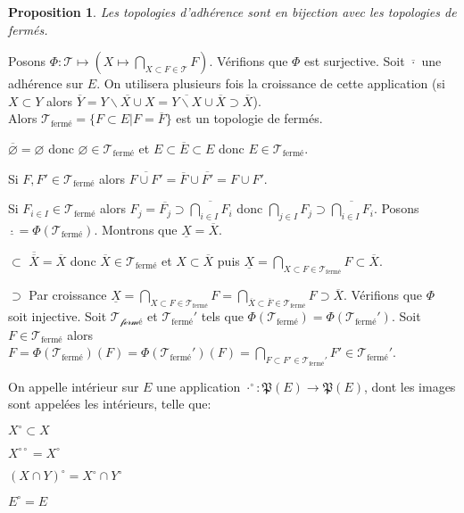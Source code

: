 \documentclass[a4paper, 11pt, french]{book}
\newenvironment{itemise}{\itemize}{\enditemize}
\theoremstyle{plain} %
\newtheorem{proposition}{Proposition}
\theoremstyle{definition} %
\theoremstyle{remark} %
\renewcommand{\setminus}{\backslash}
\newcommand{\1}{\mathds{1}}
\newcommand\vide{\varnothing}
\begin{document}
\begin{proposition}
Les topologies d'adhérence sont en bijection avec les topologies de fermés.
\end{proposition}\vspace{-3mm}
Posons $\Phi\colon\mathscr{T}\mapsto(X\mapsto\bigcap_{X\subset F\in\mathscr{T}}F)$.
Vérifions que $\Phi$ est surjective.
Soit $\overline{\cdot}$ une adhérence sur $E$.
On utilisera plusieurs fois la croissance de cette application (si $X\subset Y$ alors $\overline{Y}=\overline{Y\setminus X\cup X}=\overline{Y\setminus X}\cup\overline{X}\supset\overline{X}$). \\
Alors $\mathscr{T}_\text{fermé}=\{F\subset E|F=\overline{F}\}$ est un topologie de fermés.
\begin{itemise}
	\item $\overline{\vide}=\vide$ donc $\vide\in\mathscr{T}_\text{fermé}$ et $E\subset\overline{E}\subset E$ donc $E\in\mathscr{T}_\text{fermé}$.
	\item Si $F, F'\in\mathscr{T}_\text{fermé}$ alors $\overline{F\cup F'}=\overline{F}\cup\overline{F'}=F\cup F'$.
	\item Si $F_{i\in I}\in\mathscr{T}_\text{fermé}$ alors $F_j=\overline{F_j}\supset\overline{\bigcap_{i\in I}F_i}$ donc $\bigcap_{j\in I}F_j\supset\overline{\bigcap_{i\in I}F_i}$.
\end{itemise}
Posons $\underline{\cdot}=\Phi(\mathscr{T}_\text{fermé})$.
Montrons que $\underline{X}=\overline{X}$.
\begin{itemise}
	\item[$\subset$] $\overline{\overline{X}}=\overline{X}$ donc $\overline{X}\in\mathscr{T}_\text{fermé}$ et $X\subset\overline{X}$ puis $\underline{X}=\bigcap_{X\subset F\in\mathscr{T}_\text{fermé}}F\subset\overline{X}$.
	\item[$\supset$] Par croissance $\underline{X}=\bigcap_{X\subset F\in\mathscr{T}_\text{fermé}}F=\bigcap_{\overline{X}\subset\overline{F}\in\mathscr{T}_\text{fermé}}F\supset\overline{X}$.
\end{itemise}
Vérifions que $\Phi$ soit injective.
Soit $\mathscr{T_\text{fermé}}$ et $\mathscr{T}_\text{fermé}'$ tels que $\Phi(\mathscr{T}_\text{fermé})=\Phi(\mathscr{T}_\text{fermé}')$.
Soit $F\in\mathscr{T}_\text{fermé}$ alors $F=\Phi(\mathscr{T}_\text{fermé})(F)=\Phi(\mathscr{T}_\text{fermé}')(F)=\bigcap_{F\subset F'\in\mathscr{T}_\text{fermé}'}F'\in\mathscr{T}_\text{fermé}'$.

On appelle intérieur sur $E$ une application $\cdot^\circ\colon\mathfrak{P}(E)\rightarrow\mathfrak{P}(E)$, dont les images sont appelées les intérieurs, telle que:
\begin{itemise}
	\item $X^\circ\subset X$
	\item $X^{\circ\circ}=X^\circ$
	\item $(X\cap Y)^\circ=X^\circ\cap Y^\circ$
	\item $E^\circ=E$
\end{itemise}
\end{document}
